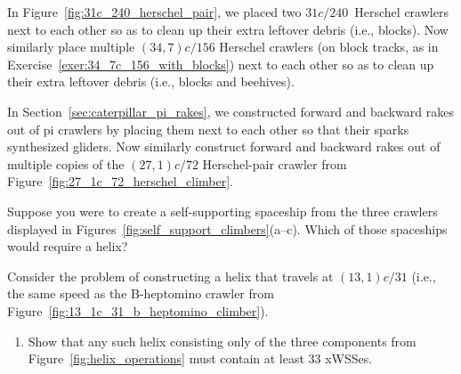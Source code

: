 \begin{multicols}{2}
\mfilbreak


\begin{problem}\label{exer:34_7c_156_cleanup} 
	In Figure~\ref{fig:31c_240_herschel_pair}, we placed two $31c/240$~Herschel crawlers next to each other so as to clean up their extra leftover debris (i.e., blocks). Now similarly place multiple $(34,7)c/156$ Herschel crawlers (on block tracks, as in Exercise~\ref{exer:34_7c_156_with_blocks}) next to each other so as to clean up their extra leftover debris (i.e., blocks and beehives).
\end{problem}


\mfilbreak


\begin{problem}\label{exer:27_1c_72_rakes} 
	In Section~\ref{sec:caterpillar_pi_rakes}, we constructed forward and backward rakes out of pi crawlers by placing them next to each other so that their sparks synthesized gliders. Now similarly construct forward and backward rakes out of multiple copies of the $(27,1)c/72$ Herschel-pair crawler from Figure~\ref{fig:27_1c_72_herschel_climber}.
\end{problem}


\mfilbreak


\begin{problemstar}\label{exer:make_self_support_need_helix} 
	Suppose you were to create a self-supporting spaceship from the three crawlers displayed in Figures~\ref{fig:self_support_climbers}(a--c). Which of those spaceships would require a helix?
\end{problemstar}


\mfilbreak


\begin{problemstar}\label{exer:13_1c_31_helix_large} 
	Consider the problem of constructing a helix that travels at $(13,1)c/31$ (i.e., the same speed as the B-heptomino crawler from Figure~\ref{fig:13_1c_31_b_heptomino_climber}).\smallskip
	
	\begin{enumerate}[label=\bf\color{ocre}(\alph*)]
		\item Show that any such helix consisting only of the three components from Figure~\ref{fig:helix_operations} must contain at least 33 xWSSes.
		

\end{enumerate}
\end{problemstar}
\end{multicols}

